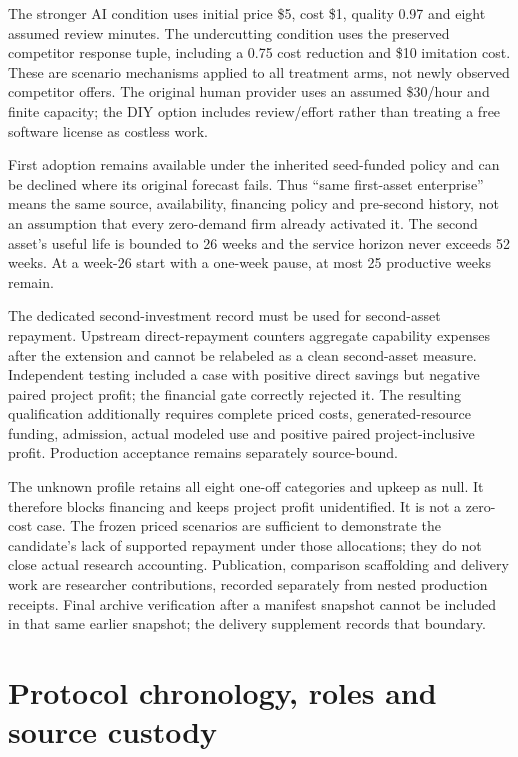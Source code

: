 \documentclass[11pt,letterpaper]{article}
\newcommand{\USD}[1]{\$#1}
\begin{document}
The stronger AI condition uses initial price \USD{5}, cost \USD{1}, quality 0.97 and eight assumed review minutes. The undercutting condition uses the preserved competitor response tuple, including a 0.75 cost reduction and \USD{10} imitation cost. These are scenario mechanisms applied to all treatment arms, not newly observed competitor offers. The original human provider uses an assumed \USD{30}/hour and finite capacity; the DIY option includes review/effort rather than treating a free software license as costless work.

First adoption remains available under the inherited seed-funded policy and can be declined where its original forecast fails. Thus ``same first-asset enterprise'' means the same source, availability, financing policy and pre-second history, not an assumption that every zero-demand firm already activated it. The second asset's useful life is bounded to 26 weeks and the service horizon never exceeds 52 weeks. At a week-26 start with a one-week pause, at most 25 productive weeks remain.

The dedicated second-investment record must be used for second-asset repayment. Upstream direct-repayment counters aggregate capability expenses after the extension and cannot be relabeled as a clean second-asset measure. Independent testing included a case with positive direct savings but negative paired project profit; the financial gate correctly rejected it. The resulting qualification additionally requires complete priced costs, generated-resource funding, admission, actual modeled use and positive paired project-inclusive profit. Production acceptance remains separately source-bound.

The unknown profile retains all eight one-off categories and upkeep as null. It therefore blocks financing and keeps project profit unidentified. It is not a zero-cost case. The frozen priced scenarios are sufficient to demonstrate the candidate's lack of supported repayment under those allocations; they do not close actual research accounting. Publication, comparison scaffolding and delivery work are researcher contributions, recorded separately from nested production receipts. Final archive verification after a manifest snapshot cannot be included in that same earlier snapshot; the delivery supplement records that boundary.

\section{Protocol chronology, roles and source custody}
\end{document}
